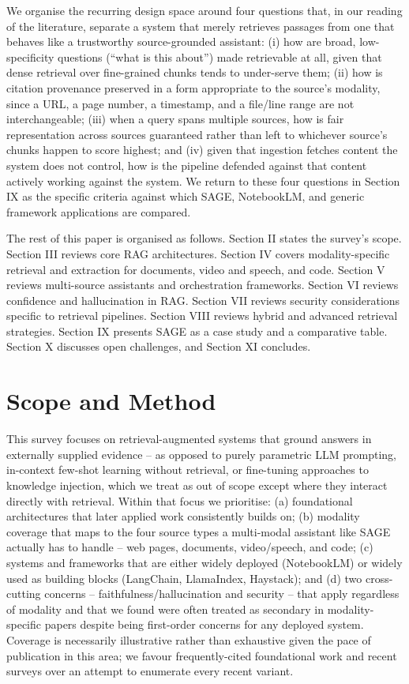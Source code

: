 \documentclass[conference]{IEEEtran}
\begin{document}
We organise the recurring design space around four questions that, in
our reading of the literature, separate a system that merely retrieves
passages from one that behaves like a trustworthy source-grounded
assistant: (i) how are broad, low-specificity questions (``what is this
about'') made retrievable at all, given that dense retrieval over
fine-grained chunks tends to under-serve them; (ii) how is citation
provenance preserved in a form appropriate to the source's modality,
since a URL, a page number, a timestamp, and a file/line range are not
interchangeable; (iii) when a query spans multiple sources, how is fair
representation across sources guaranteed rather than left to whichever
source's chunks happen to score highest; and (iv) given that ingestion
fetches content the system does not control, how is the pipeline
defended against that content actively working against the system. We
return to these four questions in Section IX as the specific criteria
against which SAGE, NotebookLM, and generic framework applications are
compared.

The rest of this paper is organised as follows. Section II states the
survey's scope. Section III reviews core RAG architectures. Section IV
covers modality-specific retrieval and extraction for documents, video
and speech, and code. Section V reviews multi-source assistants and
orchestration frameworks. Section VI reviews confidence and hallucination
in RAG. Section VII reviews security considerations specific to
retrieval pipelines. Section VIII reviews hybrid and advanced retrieval
strategies. Section IX presents SAGE as a case study and a comparative
table. Section X discusses open challenges, and Section XI concludes.

\section{Scope and Method}

This survey focuses on retrieval-augmented systems that ground answers
in externally supplied evidence -- as opposed to purely parametric LLM
prompting, in-context few-shot learning without retrieval, or fine-tuning
approaches to knowledge injection, which we treat as out of scope except
where they interact directly with retrieval. Within that focus we
prioritise: (a) foundational architectures that later applied work
consistently builds on; (b) modality coverage that maps to the four
source types a multi-modal assistant like SAGE actually has to
handle -- web pages, documents, video/speech, and code; (c) systems and
frameworks that are either widely deployed (NotebookLM) or widely used
as building blocks (LangChain, LlamaIndex, Haystack); and (d) two
cross-cutting concerns -- faithfulness/hallucination and security -- that
apply regardless of modality and that we found were often treated as
secondary in modality-specific papers despite being first-order concerns
for any deployed system. Coverage is necessarily illustrative rather than
exhaustive given the pace of publication in this area; we favour
frequently-cited foundational work and recent surveys
\cite{gao2023ragsurvey,slr2025rag,ragevalsurvey2025} over an attempt to
enumerate every recent variant.
\end{document}
